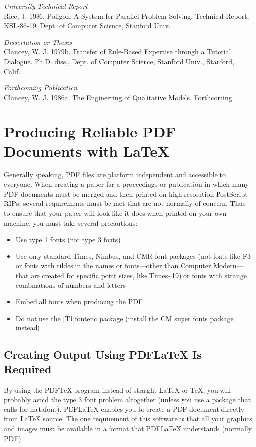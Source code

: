 \documentclass[letterpaper]{article}
\begin{document}
\smallskip \noindent \textit{University Technical Report}\\
Rice, J. 1986. Poligon: A System for Parallel Problem Solving, Technical Report, KSL-86-19, Dept. of Computer Science, Stanford Univ. 

\smallskip \noindent \textit{Dissertation or Thesis}\\
Clancey, W. J. 1979b. Transfer of Rule-Based Expertise through a Tutorial Dialogue. Ph.D. diss., Dept. of Computer Science, Stanford Univ., Stanford, Calif.

\smallskip \noindent \textit{Forthcoming Publication}\\
Clancey, W. J. 1986a. The Engineering of Qualitative Models. Forthcoming.



\section{Producing Reliable PDF\\Documents with \LaTeX{}}
Generally speaking, PDF files are platform independent and accessible to everyone. When creating a paper for a proceedings or publication in which many PDF documents must be merged and then printed on high-resolution PostScript RIPs, several requirements must be met that are not normally of concern. Thus to ensure that your paper will look like it does when printed on your own machine, you must take several precautions:
\begin{itemize}
\item Use type 1 fonts (not type 3 fonts)
\item Use only standard Times, Nimbus, and CMR font packages (not fonts like F3 or fonts with tildes in the names or fonts---other than Computer Modern---that are created for specific point sizes, like Times\~{}19) or fonts with strange combinations of numbers and letters
\item Embed all fonts when producing the PDF
\item Do not use the [T1]{fontenc} package (install the CM super fonts package instead)
\end{itemize}

\subsection{Creating Output Using PDF\LaTeX{} Is Required}
By using the PDF\TeX{} program instead of straight \LaTeX{} or \TeX{}, you will probably avoid the type 3 font problem altogether (unless you use a package that calls for metafont). PDF\LaTeX{} enables you to create a PDF document directly from \LaTeX{} source. The one requirement of this software is that all your graphics and images must be available in a format that PDF\LaTeX{} understands (normally PDF).
\end{document}
